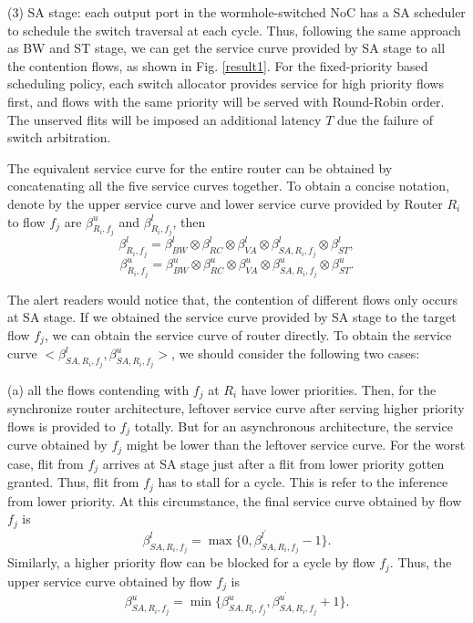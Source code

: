 \documentclass[10pt,journal]{IEEEtran}
\begin{document}
(3) SA stage: each output port in the wormhole-switched NoC has a SA scheduler to schedule the switch traversal at each cycle. Thus, following the same approach as BW and ST stage, we can get the service curve provided by SA stage to all the contention flows, as shown in Fig. \ref{result1}. For the fixed-priority based scheduling policy, each switch allocator provides service for high priority flows first, and flows with the same priority will be served with Round-Robin order. The unserved flits will be imposed an additional latency $T$ due the failure of switch arbitration.

The equivalent service curve for the entire router can be obtained by concatenating all the five service curves together. To obtain a concise notation, denote by the upper service curve and lower service curve provided by Router $R_i$ to flow $f_j$ are $\beta_{R_i,f_j}^u$ and $\beta_{R_i,f_j}^l$, then
$$\beta_{R_i,f_j}^l=\beta_{BW}^l\otimes\beta_{RC}^l\otimes\beta_{VA}^l\otimes\beta_{SA,R_i,f_j}^l\otimes \beta_{ST}^l,$$
$$\beta_{R_i,f_j}^u=\beta_{BW}^u\otimes\beta_{RC}^u\otimes\beta_{VA}^u\otimes\beta_{SA,R_i,f_j}^u\otimes \beta_{ST}^u.$$

The alert readers would notice that, the contention of different flows only occurs at SA stage. If we obtained the service curve provided by SA stage to the target flow $f_j$, we can obtain the service curve of router directly. To obtain the service curve $<\beta_{SA,R_i,f_j}^l,\beta_{SA,R_i,f_j}^u>$, we should consider the following two cases:

(a) all the flows contending with $f_j$ at $R_i$ have lower priorities. Then, for the synchronize router architecture, leftover service curve after serving higher priority flows is provided to $f_j$ totally. But for an asynchronous architecture, the service curve obtained by $f_j$ might be lower than the leftover service curve. For the worst case, flit from $f_j$ arrives at SA stage just after a flit from lower priority gotten granted. Thus, flit from $f_j$ has to stall for a cycle. This is refer to the inference from lower priority. At this circumstance, the final service curve obtained by flow $f_j$ is
\begin{equation}\label{nonpreemptbetal}
\beta^{l}_{SA,R_i,f_j}=\max\{0,\beta^{l^\prime}_{SA,R_i,f_j}-1\}.
\end{equation}
Similarly, a higher priority flow can be blocked for a cycle by flow $f_j$. Thus, the upper service curve obtained by flow $f_j$ is
\begin{equation}\label{nonpreemptbetau}
\beta^{u}_{SA,R_i,f_j}=\min\{\beta^{u}_{SA,R_i,f_j},\beta^{u^\prime}_{SA,R_i,f_j}+1\}.
\end{equation}
\end{document}
